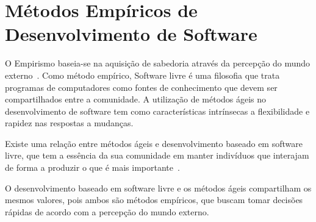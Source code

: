 \section{Métodos Empíricos de Desenvolvimento de Software}
\label{sec:desenvolvimento-empirico}

O Empirismo baseia-se na aquisição de sabedoria através da percepção do mundo 
externo~\cite{chaui2003}.	
%
Como método empírico, Software livre é uma filosofia que trata programas de computadores como fontes de 
conhecimento que devem ser compartilhados entre a comunidade.
%
A utilização de métodos ágeis no desenvolvimento de software tem como características 
intrínsecas a flexibilidade e rapidez nas respostas a mudanças. 
%

Existe uma relação entre métodos ágeis e desenvolvimento baseado em software livre, que tem a essência da sua comunidade em manter indivíduos que interajam de forma a produzir o que é mais importante~\cite{corbucci2011}. 

O desenvolvimento baseado em software livre e os métodos ágeis compartilham os mesmos valores, pois ambos são métodos empíricos, que buscam tomar decisões rápidas de acordo com a percepção do mundo externo.

